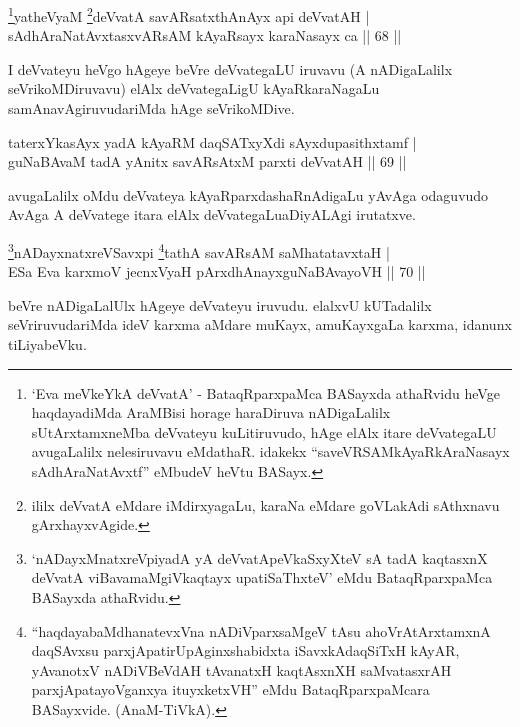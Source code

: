 \begin{shl}
\footnote{`Eva meVkeYkA deVvatA' - BataqRparxpaMca BASayxda athaRvidu heVge haqdayadiMda AraMBisi horage haraDiruva nADigaLalilx sUtArxtamxneMba deVvateyu kuLitiruvudo, hAge elAlx itare deVvategaLU avugaLalilx nelesiruvavu eMdathaR. idakekx ``saveVRSAMkAyaRkAraNasayx sAdhAraNatAvxtf'' eMbudeV heVtu BASayx.}yatheVyaM \footnote{ililx deVvatA eMdare iMdirxyagaLu, karaNa eMdare goVLakAdi sAthxnavu gArxhayxvAgide.}deVvatA savARsatxthA\s nAyx api deVvatAH |\\
sAdhAraNatAvxtasxvARsAM kAyaRsayx karaNasayx ca \hfill || 68 || 
\end{shl}

\begin{artha}
 I deVvateyu heVgo hAgeye beVre deVvategaLU iruvavu (A nADigaLalilx seVrikoMDiruvavu) elAlx deVvategaLigU kAyaRkaraNagaLu samAnavAgiruvudariMda hAge seVrikoMDive.
\end{artha}

\begin{shl}
taterxYkasAyx yadA kAyaRM daqSATxyXdi sAyxdupasithxtamf |\\
guNaBAvaM tadA yAnitx savARsAtxM parxti deVvatAH \hfill || 69 || 
\end{shl}

\begin{artha}
avugaLalilx oMdu deVvateya kAyaRparxdashaRnAdigaLu yAvAga odaguvudo AvAga A deVvatege itara elAlx deVvategaLu\break aDiyALAgi irutatxve.
\end{artha}


\begin{shl}
\footnote{`nADayxMnatxreV\s piyadA yA deVvatA\s peVkaSxyXteV sA tadA kaqtasxnX deVvatA viBavamaMgiVkaqtayx upatiSaThxteV' eMdu BataqRparxpaMca BASayxda athaRvidu.}nADayxnatxreVSavxpi \footnote{``haqdayabaMdhanatevxVna nADiVparxsaMgeV tAsu ahoVrAtArxtamxnA daqSAvxsu parxjApati\-\break rUpAginxshabidxta iSavxkAdaqSiTxH kAyAR, yAvanotxV nADiVBeVdAH tAvanatxH kaqtAsxnXH saMvatasxrAH parxjApatayoV\s ganxya ituyxketxVH'' eMdu BataqRparxpaMcara BASayxvide. (AnaM-TiVkA).}tathA savARsAM saMhatatavxtaH |\\
ESa Eva karxmoV jecnxVyaH pArxdhAnayxguNaBAvayoVH \hfill || 70 || 
\end{shl}


\begin{artha}
 beVre nADigaLalUlx hAgeye deVvateyu iruvudu. elalxvU kUTadalilx seVriruvudariMda ideV karxma aMdare muKayx, amuKayxgaLa karxma, idanunx tiLiyabeVku.
\end{artha}

